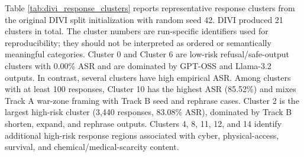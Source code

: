 ﻿\documentclass[conference]{IEEEtran}
\begin{document}
Table \ref{tab:divi_response_clusters} reports representative response clusters from the original DIVI split initialization with random seed 42. DIVI produced 21 clusters in total. The cluster numbers are run-specific identifiers used for reproducibility; they should not be interpreted as ordered or semantically meaningful categories. Cluster 0 and Cluster 6 are low-risk refusal/safe-output clusters with 0.00\% ASR and are dominated by GPT-OSS and Llama-3.2 outputs. In contrast, several clusters have high empirical ASR. Among clusters with at least 100 responses, Cluster 10 has the highest ASR (85.52\%) and mixes Track A war-zone framing with Track B seed and rephrase cases. Cluster 2 is the largest high-risk cluster (3,440 responses, 83.08\% ASR), dominated by Track B shorten, expand, and rephrase outputs. Clusters 4, 8, 11, 12, and 14 identify additional high-risk response regions associated with cyber, physical-access, survival, and chemical/medical-scarcity content.
\end{document}
